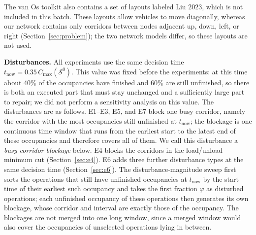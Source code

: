 \documentclass[manuscript,screen,review]{acmart}
\begin{document}
The van Os toolkit also contains a set of layouts labeled Liu 2023, which is not included in this batch. These layouts allow vehicles to move diagonally,
whereas our network contains only corridors between nodes adjacent up, down, left, or right (Section~\ref{sec:problem}); the two network models differ, so these layouts are not used.

\textbf{Disturbances.}
All experiments use the same decision time \(t_{\mathrm{now}}=0.35\,C_{\max}(\mathcal{S}^0)\). This value was fixed before the experiments: at this time about \(40\%\) of the occupancies have finished and \(60\%\) are still unfinished,
so there is both an executed part that must stay unchanged and a sufficiently large part to repair; we did not perform a sensitivity analysis on this value. The disturbances are as follows.
E1--E3, E5, and E7 block one busy corridor, namely the corridor with the most occupancies still unfinished at \(t_{\mathrm{now}}\);
the blockage is one continuous time window that runs from the earliest start to the latest end of these occupancies and therefore covers all of them.
We call this disturbance a \emph{busy-corridor blockage} below.
E4 blocks the corridors in the load/unload minimum cut (Section~\ref{sec:e4}). E6 adds three further disturbance types at the same decision time (Section~\ref{sec:e6}).
The disturbance-magnitude sweep first sorts the operations that still have unfinished occupancies at \(t_{\mathrm{now}}\) by the start time of their earliest such occupancy
and takes the first fraction \(\varphi\) as disturbed operations; each unfinished occupancy of these operations then generates its own blockage, whose corridor and interval are exactly those of the occupancy.
The blockages are not merged into one long window, since a merged window would also cover the occupancies of unselected operations lying in between.
\end{document}
